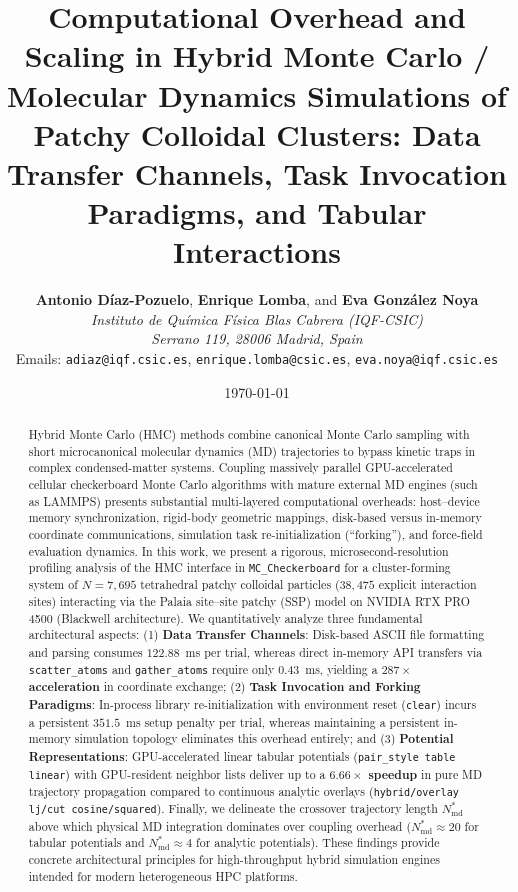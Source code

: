 \documentclass[11pt,a4paper]{article}
\title{\textbf{Computational Overhead and Scaling in Hybrid Monte Carlo / Molecular Dynamics Simulations of Patchy Colloidal Clusters: Data Transfer Channels, Task Invocation Paradigms, and Tabular Interactions}}
\author{
    \textbf{Antonio D\'{i}az-Pozuelo}, \textbf{Enrique Lomba}, and \textbf{Eva Gonz\'{a}lez Noya}\\[0.5em]
    \textit{Instituto de Qu\'{i}mica F\'{i}sica Blas Cabrera (IQF-CSIC)}\\
    \textit{Serrano 119, 28006 Madrid, Spain}\\[0.3em]
    \small Emails: \texttt{adiaz@iqf.csic.es}, \texttt{enrique.lomba@csic.es}, \texttt{eva.noya@iqf.csic.es}
}
\date{\today}
\begin{document}
\maketitle

\begin{abstract}
Hybrid Monte Carlo (HMC) methods combine canonical Monte Carlo sampling with short microcanonical molecular dynamics (MD) trajectories to bypass kinetic traps in complex condensed-matter systems. Coupling massively parallel GPU-accelerated cellular checkerboard Monte Carlo algorithms with mature external MD engines (such as LAMMPS) presents substantial multi-layered computational overheads: host--device memory synchronization, rigid-body geometric mappings, disk-based versus in-memory coordinate communications, simulation task re-initialization (``forking''), and force-field evaluation dynamics. In this work, we present a rigorous, microsecond-resolution profiling analysis of the HMC interface in \texttt{MC\_Checkerboard} for a cluster-forming system of $N = 7{,}695$ tetrahedral patchy colloidal particles ($38{,}475$ explicit interaction sites) interacting via the Palaia site--site patchy (SSP) model on NVIDIA RTX PRO 4500 (Blackwell architecture). We quantitatively analyze three fundamental architectural aspects: (1) \textbf{Data Transfer Channels}: Disk-based ASCII file formatting and parsing consumes $122.88$~ms per trial, whereas direct in-memory API transfers via \texttt{scatter\_atoms} and \texttt{gather\_atoms} require only $0.43$~ms, yielding a \textbf{$287\times$ acceleration} in coordinate exchange; (2) \textbf{Task Invocation and Forking Paradigms}: In-process library re-initialization with environment reset (\texttt{clear}) incurs a persistent $351.5$~ms setup penalty per trial, whereas maintaining a persistent in-memory simulation topology eliminates this overhead entirely; and (3) \textbf{Potential Representations}: GPU-accelerated linear tabular potentials (\texttt{pair\_style table linear}) with GPU-resident neighbor lists deliver up to a \textbf{$6.66\times$ speedup} in pure MD trajectory propagation compared to continuous analytic overlays (\texttt{hybrid/overlay lj/cut cosine/squared}). Finally, we delineate the crossover trajectory length $N_{\mathrm{md}}^*$ above which physical MD integration dominates over coupling overhead ($N_{\mathrm{md}}^* \approx 20$ for tabular potentials and $N_{\mathrm{md}}^* \approx 4$ for analytic potentials). These findings provide concrete architectural principles for high-throughput hybrid simulation engines intended for modern heterogeneous HPC platforms.
\end{abstract}
\end{document}
